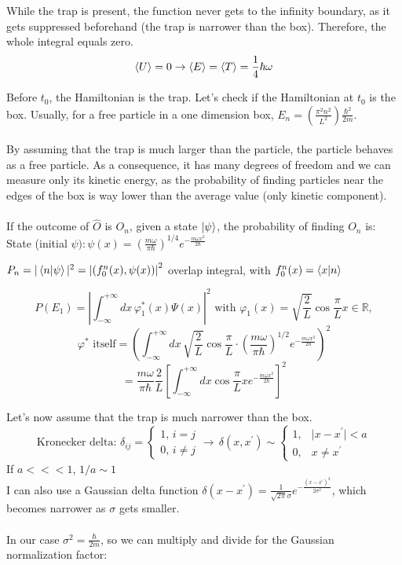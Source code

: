 \noindent
While the trap is present, the function never gets to the infinity boundary, as it gets suppressed beforehand (the trap is narrower than the box).
Therefore, the whole integral equals zero.\\
$$\expval{U}=0 \rightarrow \expval{E}=\expval{T}=\frac{1}{4} \hbar \omega $$

\noindent
Before $t_0$, the Hamiltonian is the trap.
Let's check if the Hamiltonian at $t_0$ is the box.
Usually, for a free particle in a one dimension box,  $E_n=\left(\frac{\pi^{2}n^2}{L^2}\right)\frac{\hbar^{2}}{2 m}$.\\
\\
By assuming that the trap is much larger than the particle, the particle behaves as a free particle.
As a consequence, it has many degrees of freedom and we can measure only its kinetic energy, as the probability of finding particles near the edges of the box is way lower than the average value (only kinetic component).\\
\\
\noindent
If the outcome of $\hat{O}$ is $O_n$, given a state $\ket{\psi}$, the probability of finding $O_n$ is:
\\
State (initial $\psi): \psi(x)=\left(\frac{m \omega}{ \pi \hbar}\right)^{1 / 4} e^{-\frac{m \omega x^{2}}{2 \hbar}}$

$P_{n}=|\bra{n} \ket{\psi}|^{2}=\left|\left(f_{0}^{n}(x), \psi(x)\right)\right|^{2}$ overlap integral, with $f_{0}^{n}(x)=\bra{x}\ket{n}$

\[P\left(E_{1}\right)=\left|\int_{-\infty}^{+\infty} d x\, \varphi_{1}^{*}(x) \Psi(x)\right|^{2}
\text{ with }
\varphi_{1}(x)=\sqrt{\frac{2}{L}} \cos \frac{\pi}{L}x \in \mathbb{R},\]
\[\varphi^{*} \text{ itself}
=\left(\int_{-\infty}^{+\infty} d x\,\sqrt{\frac{2}{L}} \cos \frac{\pi}{L} \cdot \left(\frac{m \omega}{ \pi \hbar}\right)^{1 / 2} e^{-\frac{m \omega x^{2}}{2 \hbar}}\right)^{2}
\]
$$=\frac{m \omega}{ \pi \hbar}\frac{2}{L} \left[\int_{-\infty}^{+\infty} d x \cos \frac{\pi}{L} x e^{-\frac{m \omega x^{2}}{2 \hbar}}\right]^{2}$$

\noindent
Let's now assume that the trap is much narrower than the box.
\[\text{Kronecker delta: }  \delta_{i j}=\begin{cases}1,\, i=j \\ 0,\, i \neq j \end{cases} \rightarrow\, \delta(x, x^{\prime}) \sim\begin{cases}1,& \mid x-x^{\prime} \mid<a \\ 0, & x \neq x^{\prime}\end{cases}
\]
If $a<<<1$, $1/a\sim 1$\\
I can also use a Gaussian delta function  $\delta\left(x-x^{\prime}\right)=\frac{1}{\sqrt{2 \pi} \sigma} e^{-\frac{\left(x-x^{\prime}\right)^{2}}{2 \sigma^{2}}}$, which becomes narrower as $\sigma$ gets smaller.\\
\\
In our case $\sigma^2= \frac{\hbar}{2m}$, so we can multiply and divide for the Gaussian normalization factor:

